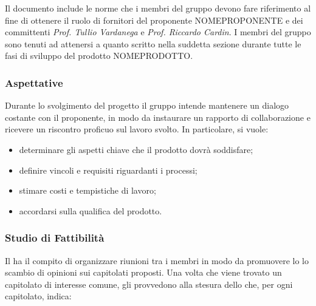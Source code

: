 Il documento include le norme che i membri del gruppo \Gruppo{} devono fare riferimento al fine di ottenere il ruolo di fornitori del proponente NOMEPROPONENTE e dei committenti \textit{Prof. Tullio Vardanega} e \textit{Prof. Riccardo Cardin}. I membri del gruppo sono tenuti ad attenersi a quanto scritto nella suddetta sezione durante tutte le fasi di sviluppo del prodotto NOMEPRODOTTO.

\subsubsection{Aspettative}

Durante lo svolgimento del progetto il gruppo intende mantenere un dialogo costante con il proponente, in modo da instaurare un rapporto di collaborazione e ricevere un riscontro proficuo sul lavoro svolto.  In particolare, si vuole:
\begin{itemize}

\item determinare gli aspetti chiave che il prodotto dovrà soddisfare;

\item definire vincoli e requisiti riguardanti i processi;

\item stimare costi e tempistiche di lavoro;

\item accordarsi sulla qualifica del prodotto.

\end{itemize}


\subsubsection{Studio di Fattibilità}

Il \RdP{} ha il compito di organizzare riunioni tra i membri in modo da promuovere lo lo scambio di opinioni sui capitolati proposti. Una volta che viene trovato un capitolato di interesse comune, gli \anas{} provvedono alla stesura dello \SdF{} che, per ogni capitolato, indica:

